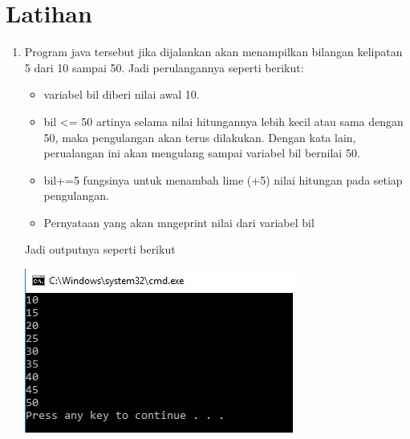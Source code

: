 \documentclass[a4paper,12pt]{article}
\begin{document}
\section{Latihan}
\begin{enumerate}
	\item 
	\begin{minipage}[t]{\linewidth}
		\raggedright
	\end{minipage}
	Program java tersebut jika dijalankan akan menampilkan bilangan kelipatan 5 dari 10 sampai 50. Jadi perulangannya seperti berikut:
	\begin{itemize}
		\item variabel bil diberi nilai awal 10.
		\item bil <= 50 artinya selama nilai hitungannya lebih kecil atau sama dengan 50, maka pengulangan akan terus dilakukan. Dengan kata lain, perualangan ini akan mengulang sampai variabel bil bernilai 50.
		\item bil+=5 fungsinya untuk menambah lime (+5) nilai hitungan pada setiap pengulangan.
		\item Pernyataan yang akan mngeprint nilai dari variabel bil 
	\end{itemize}
	Jadi outputnya seperti berikut
	\begin{center}
		\includegraphics[scale=1]{Capture14}
	\end{center}
	

\end{enumerate}
\end{document}
